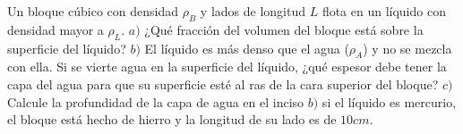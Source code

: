 \begin{mdframed}[style=warning]
	\begin{ejercicio}
		Un bloque cúbico con densidad $\rho _B$ y lados de longitud $L$ flota en un líquido con densidad mayor a $\rho _L$. $a)$ ¿Qué fracción del volumen del bloque está sobre la superficie del líquido? $b)$ El líquido es más denso que el agua ($\rho _A$) y no se mezcla con ella. Si se vierte agua en la superficie del líquido, ¿qué espesor debe tener la capa del agua para que su superficie esté al ras de la cara superior del bloque? $c)$ Calcule la profundidad de la capa de agua en el inciso $b)$ si el líquido es mercurio, el bloque está hecho de hierro y la longitud de su lado es de $10cm$.
	\end{ejercicio}
\end{mdframed}
















